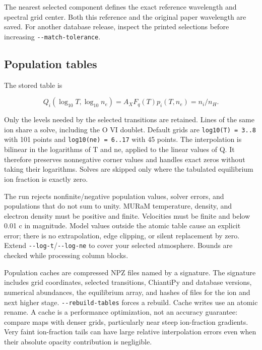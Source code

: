 \documentclass[
]{article}
\newcommand{\passthrough}[1]{#1}
\begin{document}
The nearest selected component defines the exact reference wavelength
and spectral grid center. Both this reference and the original paper
wavelength are saved. For another database release, inspect the printed
selections before increasing
\passthrough{\lstinline!--match-tolerance!}.

\subsection{Population tables}\label{population-tables}

The stored table is

\[
Q_i(\log_{10}T,\log_{10}n_e)=A_X F_q(T)p_i(T,n_e)=n_i/n_H.
\]

Only the levels needed by the selected transitions are retained. Lines
of the same ion share a solve, including the O VI doublet. Default grids
are \passthrough{\lstinline!log10(T) = 3..8!} with 101 points and
\passthrough{\lstinline!log10(ne) = 6..17!} with 45 points. The
interpolation is bilinear in the logarithms of T and ne, applied to the
linear values of Q. It therefore preserves nonnegative corner values and
handles exact zeros without taking their logarithms. Solves are skipped
only where the tabulated equilibrium ion fraction is exactly zero.

The run rejects nonfinite/negative population values, solver errors, and
populations that do not sum to unity. MURaM temperature, density, and
electron density must be positive and finite. Velocities must be finite
and below 0.01 c in magnitude. Model values outside the atomic table
cause an explicit error; there is no extrapolation, edge clipping, or
silent replacement by zero. Extend
\passthrough{\lstinline!--log-t!}/\passthrough{\lstinline!--log-ne!} to
cover your selected atmosphere. Bounds are checked while processing
column blocks.

Population caches are compressed NPZ files named by a signature. The
signature includes grid coordinates, selected transitions, ChiantiPy and
database versions, numerical abundances, the equilibrium array, and
hashes of files for the ion and next higher stage.
\passthrough{\lstinline!--rebuild-tables!} forces a rebuild. Cache
writes use an atomic rename. A cache is a performance optimization, not
an accuracy guarantee: compare maps with denser grids, particularly near
steep ion-fraction gradients. Very faint ion-fraction tails can have
large relative interpolation errors even when their absolute opacity
contribution is negligible.
\end{document}
